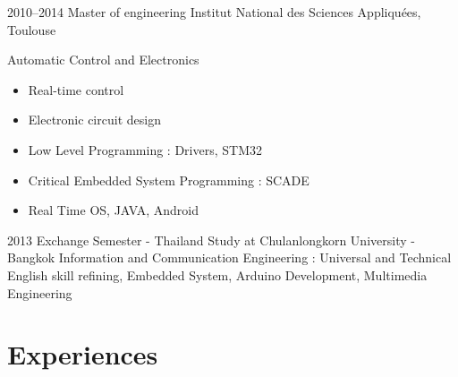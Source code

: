 \documentclass[a4paper]{friggeri-cv} %
\begin{document}
\begin{entrylist}

\entry
{2010--2014}
{Master of engineering}
{Institut National des Sciences Appliquées, Toulouse}
{ Automatic Control and Electronics
\begin{itemize}
\item Real-time control 
\item Electronic circuit design
\item Low Level Programming : Drivers, STM32
\item Critical Embedded System Programming : SCADE
\item Real Time OS, JAVA, Android
\end{itemize}}


\entry
{2013}
{Exchange Semester - Thailand}
{Study at Chulanlongkorn University - Bangkok}
{Information and Communication Engineering : 
Universal and Technical English skill refining, Embedded System, Arduino Development, Multimedia Engineering}



\end{entrylist}


\section{Experiences}
\end{document}
